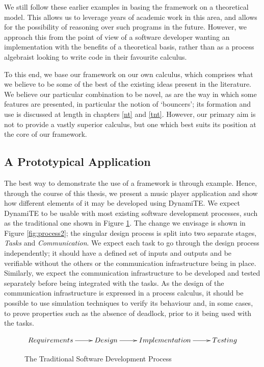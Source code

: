 We still follow these earlier examples in basing the framework on a
theoretical model.  This allows us to leverage years of academic work
in this area, and allows for the possibility of reasoning over such
programs in the future.  However, we approach this from the point of
view of a software developer wanting an implementation with the
benefits of a theoretical basis, rather than as a process algebraist
looking to write code in their favourite calculus.

To this end, we base our framework on our own calculus, which
comprises what we believe to be some of the best of the existing ideas
present in the literature.  We believe our particular combination to
be novel, as are the way in which some features are presented, in
particular the notion of `bouncers'; its formation and use is
discussed at length in chapters \ref{nt} and \ref{tnt}.  However, our
primary aim is not to provide a vastly superior calculus, but one
which best suits its position at the core of our framework.

\subsection{A Prototypical Application}
\label{app:req}

The best way to demonstrate the use of a framework is through example.
Hence, through the course of this thesis, we present a music player
application and show how different elements of it may be developed
using DynamiTE.  We expect DynamiTE to be usable with most existing
software development processes, such as the traditional one shown in
Figure \ref{fig:process1}.  The change we envisage is shown in Figure
\ref{fig:process2}; the singular design process is split into two
separate stages, \emph{Tasks} and \emph{Communication}.  We expect
each task to go through the design process independently; it should
have a defined set of inputs and outputs and be verifiable without the
others or the communication infrastructure being in place.  Similarly,
we expect the communication infrastructure to be developed and tested
separately before being integrated with the tasks.  As the design of
the communication infrastructure is expressed in a process calculus,
it should be possible to use simulation techniques to verify its
behaviour and, in some cases, to prove properties such as the absence
of deadlock, prior to it being used with the tasks.

\begin{figure}  
  \centering
\[\CompileMatrices
\xymatrix{
Requirements \ar@{->}[r] &
Design \ar@{->}[r] &
Implementation \ar@{->}[r] &
Testing \\
}
\]
  \caption{The Traditional Software Development Process}
  \label{fig:process1}
\end{figure}

